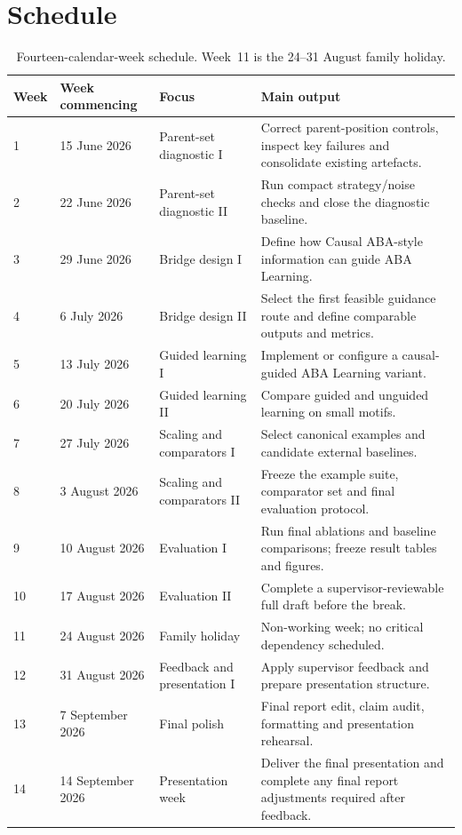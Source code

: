 \section{Schedule}
\label{sec:project-plan-schedule}
\begin{table}[htbp]
\centering
\scriptsize
\caption{Fourteen-calendar-week schedule. Week~11 is the 24--31 August family holiday.}
\label{tab:project-plan-schedule}
\begin{tabular}{p{}p{}p{}p{}}
\toprule
Week & Week commencing & Focus & Main output \\
\midrule
1 & 15 June 2026 & Parent-set diagnostic I & Correct parent-position controls, inspect key failures and consolidate existing artefacts. \\
2 & 22 June 2026 & Parent-set diagnostic II & Run compact strategy/noise checks and close the diagnostic baseline. \\
3 & 29 June 2026 & Bridge design I & Define how Causal ABA-style information can guide ABA Learning. \\
4 & 6 July 2026 & Bridge design II & Select the first feasible guidance route and define comparable outputs and metrics. \\
5 & 13 July 2026 & Guided learning I & Implement or configure a causal-guided ABA Learning variant. \\
6 & 20 July 2026 & Guided learning II & Compare guided and unguided learning on small motifs. \\
7 & 27 July 2026 & Scaling and comparators I & Select canonical examples and candidate external baselines. \\
8 & 3 August 2026 & Scaling and comparators II & Freeze the example suite, comparator set and final evaluation protocol. \\
9 & 10 August 2026 & Evaluation I & Run final ablations and baseline comparisons; freeze result tables and figures. \\
10 & 17 August 2026 & Evaluation II & Complete a supervisor-reviewable full draft before the break. \\
11 & 24 August 2026 & Family holiday & Non-working week; no critical dependency scheduled. \\
12 & 31 August 2026 & Feedback and presentation I & Apply supervisor feedback and prepare presentation structure. \\
13 & 7 September 2026 & Final polish & Final report edit, claim audit, formatting and presentation rehearsal. \\
14 & 14 September 2026 & Presentation week & Deliver the final presentation and complete any final report adjustments required after feedback. \\
\bottomrule
\end{tabular}
\end{table}

